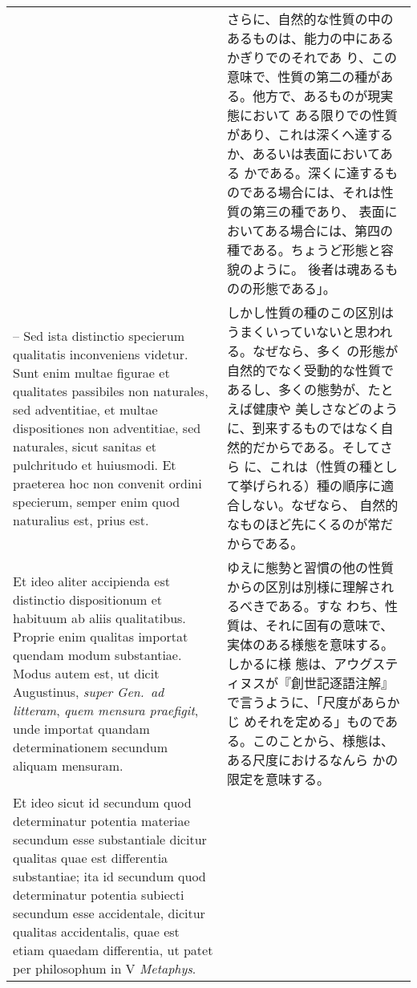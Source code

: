 \documentclass[10pt]{jsarticle} %
\begin{document}
\begin{longtable}{p{21em}p{21em}}
&

さらに、自然的な性質の中のあるものは、能力の中にあるかぎりでのそれであ
り、この意味で、性質の第二の種がある。他方で、あるものが現実態において
ある限りでの性質があり、これは深くへ達するか、あるいは表面においてある
かである。深くに達するものである場合には、それは性質の第三の種であり、
表面においてある場合には、第四の種である。ちょうど形態と容貌のように。
後者は魂あるものの形態である」。


\\



-- Sed ista distinctio specierum qualitatis
inconveniens videtur. Sunt enim multae figurae et qualitates
passibiles non naturales, sed adventitiae, et multae dispositiones non
adventitiae, sed naturales, sicut sanitas et pulchritudo et
huiusmodi. 
Et praeterea hoc non convenit ordini specierum, semper enim
quod naturalius est, prius est. 


&

しかし性質の種のこの区別はうまくいっていないと思われる。なぜなら、多く
の形態が自然的でなく受動的な性質であるし、多くの態勢が、たとえば健康や
美しさなどのように、到来するものではなく自然的だからである。そしてさら
に、これは（性質の種として挙げられる）種の順序に適合しない。なぜなら、
自然的なものほど先にくるのが常だからである。


\\


Et ideo aliter accipienda est
distinctio dispositionum et habituum ab aliis qualitatibus. Proprie
enim qualitas importat quendam modum substantiae. Modus autem est, ut
dicit Augustinus, {\itshape super Gen.~ad litteram}, {\itshape quem mensura praefigit}, unde
importat quandam determinationem secundum aliquam mensuram. 


&

ゆえに態勢と習慣の他の性質からの区別は別様に理解されるべきである。すな
わち、性質は、それに固有の意味で、実体のある様態を意味する。しかるに様
態は、アウグスティヌスが『創世記逐語注解』で言うように、「尺度があらかじ
めそれを定める」ものである。このことから、様態は、ある尺度におけるなんら
かの限定を意味する。

\\


Et ideo
sicut id secundum quod determinatur potentia materiae secundum esse
substantiale dicitur qualitas quae est differentia substantiae; ita id
secundum quod determinatur potentia subiecti secundum esse
accidentale, dicitur qualitas accidentalis, quae est etiam quaedam
differentia, ut patet per philosophum in V {\itshape Metaphys}. 



\end{longtable}
\end{document}
